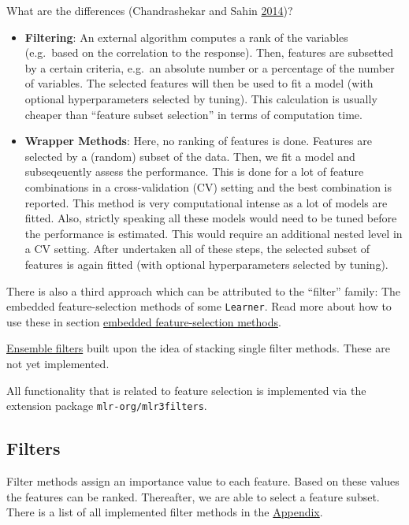 \documentclass[
  11pt,
  parskip=half,
  DIV=calc,
  BCOR=10mm,
  x11names]{scrbook}
\providecommand{\tightlist}{%
  \setlength{\itemsep}{0pt}\setlength{\parskip}{0pt}}
\begin{document}
What are the differences (Chandrashekar and Sahin \protect\hyperlink{ref-chandrashekar2014}{2014})?

\begin{itemize}
\tightlist
\item
  \textbf{Filtering}: An external algorithm computes a rank of the variables (e.g.~based on the correlation to the response).
  Then, features are subsetted by a certain criteria, e.g.~an absolute number or a percentage of the number of variables.
  The selected features will then be used to fit a model (with optional hyperparameters selected by tuning).
  This calculation is usually cheaper than ``feature subset selection'' in terms of computation time.
\item
  \textbf{Wrapper Methods}: Here, no ranking of features is done.
  Features are selected by a (random) subset of the data.
  Then, we fit a model and subseqeuently assess the performance.
  This is done for a lot of feature combinations in a cross-validation (CV) setting and the best combination is reported.
  This method is very computational intense as a lot of models are fitted.
  Also, strictly speaking all these models would need to be tuned before the performance is estimated.
  This would require an additional nested level in a CV setting.
  After undertaken all of these steps, the selected subset of features is again fitted (with optional hyperparameters selected by tuning).
\end{itemize}

There is also a third approach which can be attributed to the ``filter'' family:
The embedded feature-selection methods of some \texttt{Learner}.
Read more about how to use these in section \protect\hyperlink{fs-embedded}{embedded feature-selection methods}.

\href{\%7B\#fs-ensemble\%7D}{Ensemble filters} built upon the idea of stacking single filter methods.
These are not yet implemented.

All functionality that is related to feature selection is implemented via the extension package \texttt{mlr-org/mlr3filters}.

\hypertarget{fs-filter}{%
\subsection{Filters}\label{fs-filter}}

Filter methods assign an importance value to each feature.
Based on these values the features can be ranked.
Thereafter, we are able to select a feature subset.
There is a list of all implemented filter methods in the \protect\hyperlink{list-filters}{Appendix}.
\end{document}
